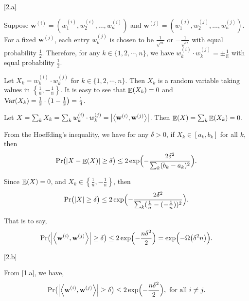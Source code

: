 \documentclass{homework}
\begin{document}
\begin{solution}

  \ref{2.a}

  Suppose $\mathbf{w}^{(i)} = (w_1^{(i)}, w_2^{(i)}, \ldots, w_n^{(i)})$
  and $\mathbf{w}^{(j)} = (w_1^{(j)}, w_2^{(j)}, \ldots, w_n^{(j)})$.
  For a fixed $\mathbf{w}^{(j)}$, each entry $w_k^{(j)}$ is chosen
  to be $\frac{1}{\sqrt{n}}$ or $-\frac{1}{\sqrt{n}}$ with equal probability $\frac{1}{2}$.
  Therefore, for any $k \in \{1, 2, \cdots, n\}$, we have $w_k^{(i)} \cdot w_k^{(j)} = \pm \frac{1}{n}$
  with equal probability $\frac{1}{2}$.

  Let $X_k = w_k^{(i)} \cdot w_k^{(j)}$ for $k \in \{1, 2, \cdots, n\}$.
  Then $X_k$ is a random variable taking values in $\left\{ \frac{1}{n}, -\frac{1}{n} \right\}$.
  It is easy to see that $\mathop{\mathbb{E}}\displaylimits(X_k) = 0$ and $\mathop{\mathrm{Var}}\displaylimits(X_k) = \frac{1}{2}\cdot \bigl(1 - \frac{1}{2}\bigr) = \frac{1}{4}$.

  Let $X = \sum_{k} X_k = \sum_{k} w_k^{(i)} \cdot w_k^{(j)} = \left\lvert \left\langle\mathbf{w}^{(i)},\mathbf{w}^{(j)}\right\rangle \right\rvert$.
  Then $\mathop{\mathbb{E}}\displaylimits(X) = \sum_{k} \mathop{\mathbb{E}}\displaylimits(X_k) = 0$.

  From the Hoeffding's inequality, we have for any $\delta > 0$, if $X_k \in [a_k, b_k]$
  for all $k$, then
  \begin{equation*}
    \Pr \bigl( \left\lvert X - \mathop{\mathbb{E}}\displaylimits(X) \right\rvert \ge \delta \bigr)
    \le 2 \exp \Bigl( - \frac{2\delta^2}{\sum_{k} (b_k - a_k)^2} \Bigr).
  \end{equation*}

  Since $\mathop{\mathbb{E}}\displaylimits(X) = 0$, and $X_k \in \left\{ \frac{1}{n}, -\frac{1}{n} \right\}$, then
  \begin{equation*}
    \Pr \bigl( \left\lvert X \right\rvert \ge \delta \bigr) \le
    2 \exp \Bigl( - \frac{2\delta^2}{\sum_{k} (\frac{1}{n} - (-\frac{1}{n}))^2} \Bigr).
  \end{equation*}

  That is to say,
  \begin{equation*}
    \Pr \bigl( \left\lvert \left\langle\mathbf{w}^{(i)},\mathbf{w}^{(j)}\right\rangle \right\rvert \ge \delta \bigr)
    \le 2 \exp \Bigl( - \frac{n\delta^2}{2} \Bigr)
    = \exp \Bigl( - \Omega \bigl( \delta^{2} n \bigr) \Bigr).
  \end{equation*}

  \ref{2.b}

  From \ref{1.a}, we have,
  \begin{equation*}
    \Pr \bigl( \left\lvert \left\langle\mathbf{w}^{(i)},\mathbf{w}^{(j)}\right\rangle \right\rvert \ge \delta \bigr)
    \le 2 \exp \Bigl( - \frac{n\delta^2}{2} \Bigr), \text{ for all } i \ne j.
  \end{equation*}


\end{solution}
\end{document}
